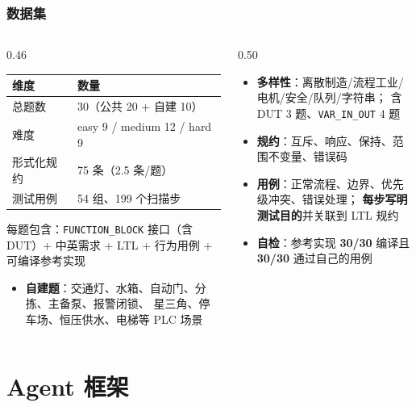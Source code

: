\documentclass[10pt,aspectratio=169]{beamer}
\begin{document}
\begin{frame}
  \frametitle{数据集}

  \begin{columns}[T]
    \begin{column}{0.46\textwidth}
      \centering
      \small
      \begin{tabular}{@{}ll@{}}
        \hline
        维度 & 数量 \\
        \hline
        总题数 & 30（公共 20 + 自建 10） \\
        难度 & easy 9 / medium 12 / hard 9 \\
        形式化规约 & 75 条（2.5 条/题） \\
        测试用例 & 54 组、199 个扫描步 \\
        \hline
      \end{tabular}

      \vspace{2mm}
      \raggedright\scriptsize
      每题包含：\texttt{FUNCTION\_BLOCK} 接口（含 DUT）+
      中英需求 + LTL + 行为用例 + 可编译参考实现
      \normalsize
      \begin{itemize}
        \item \textbf{自建题}：交通灯、水箱、自动门、分拣、主备泵、报警闭锁、
              星三角、停车场、恒压供水、电梯等 PLC 场景
      \end{itemize}
    \end{column}
    \begin{column}{0.50\textwidth}
      \begin{itemize}
        \item \textbf{多样性}：离散制造/流程工业/电机/安全/队列/字符串；
              含 DUT 3 题、\texttt{VAR\_IN\_OUT} 4 题
        \item \textbf{规约}：互斥、响应、保持、范围不变量、错误码
        \item \textbf{用例}：正常流程、边界、优先级冲突、错误处理；
              \textbf{每步写明测试目的}并关联到 LTL 规约
        \item \textbf{自检}：参考实现 \textbf{30/30} 编译且 \textbf{30/30}
              通过自己的用例
      \end{itemize}
    \end{column}
  \end{columns}

\end{frame}

\section{Agent 框架}
\end{document}
